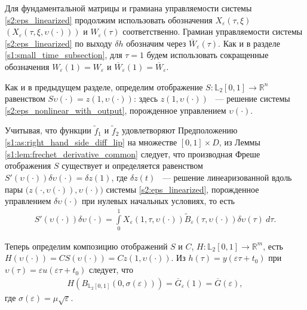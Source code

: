 \documentclass[../main.tex]{subfiles}
\begin{document}
Для фундаментальной матрицы и грамиана управляемости системы \eqref{s2:eps_linearized} продолжим использовать обозначения  $ X_{\varepsilon}(\tau,\xi) $ $(X_{\varepsilon}(\tau, \xi, \upsilon(\cdot)))$ и $W_{\varepsilon}(\tau)$ соответственно. 
Грамиан управляемости системы \eqref{s2:eps_linearized} по выходу $ \delta h$ обозначим через $\overline{W}_{\varepsilon}(\tau)$. 
Как и в разделе \ref{s1:small_time_subsection}, для $\tau = 1$ будем использовать сокращенные обозначения $W_{\varepsilon}(1) = W_{\varepsilon}$ и $\overline{W}_{\varepsilon}(1) = \overline{W}_{\varepsilon}$. 

Как и в предыдущем разделе, определим отображение $S: \mathbb{L}_2[0,1] \rightarrow \mathbb{R}^n $ равенством $S\upsilon(\cdot) = z(1,\upsilon(\cdot))$: здесь $ z(1,\upsilon(\cdot))$ ~--- решение системы \eqref{s2:eps_nonlinear_with_output}, порожденное управлением $\upsilon(\cdot)$. 

Учитывая, что функции  $\widetilde{f}_1$ и $\widetilde{f}_2$ удовлетворяют Предположению \ref{s1:as:right_hand_side_diff_lip} на множестве $[0, 1]\times D$, из Леммы \ref{s1:lem:frechet_derivative_common}  следует, что производная Фреше отображения $S$ существует и определяется равенством $ S'(\upsilon(\cdot))\delta \upsilon(\cdot) = \delta z(1)$, где $\delta z(t)$ ~--- решение линеаризованной вдоль пары $\big( z(\cdot,\upsilon(\cdot)),\upsilon(\cdot)\big)  $ системы \eqref{s2:eps_linearized}, порожденное управлением $\delta \upsilon(\cdot)$ при нулевых начальных условиях, то есть
\begin{gather}\label{s2:freсhet_differential_of_scaled_map}
	S'(\upsilon(\cdot))\delta \upsilon(\cdot) = \int\limits_0^1  X_{\varepsilon}(1, \tau, \upsilon(\cdot)) \widetilde{B}_{\varepsilon}(\tau, \upsilon(\cdot))  \delta\upsilon(\tau)\ d\tau. 
\end{gather}

 Теперь определим композицию отображений $ S $ и $ C $, $ H: \mathbb{L}_2[0,1]  \rightarrow \mathbb{R}^m $, есть $ H(\upsilon(\cdot)) = C S(\upsilon(\cdot)) = C z(1,\upsilon(\cdot)) $. 
Из $h(\tau) = y(\varepsilon \tau + t_0)$ при $ \upsilon(\tau) = \varepsilon u(\varepsilon \tau + t_0) $ следует, что  
\begin{gather*}
	H(B_{\mathbb{L}_2[0,1]}(0,\sigma(\varepsilon))) = \overline{G}_{\varepsilon}(1) = \overline{G}(\varepsilon), 
\end{gather*}
где $ \sigma(\varepsilon) = \mu \sqrt{\varepsilon} $.
\end{document}
